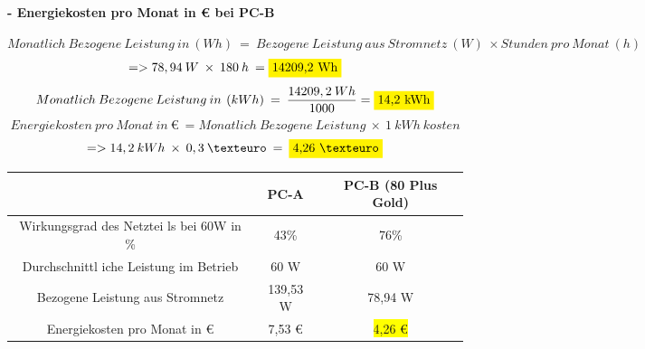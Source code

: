\documentclass[a4paper]{article}
\begin{document}
    \paragraph{\color{codegreen} - Energiekosten pro Monat in € bei PC-B}
    \begin{equation*}
        Monatlich\:Bezogene\:Leistung\:in\:\left(Wh\right)\:=\:Bezogene\:Leistung\:aus\:Stromnetz\:\left(W\right)\:\times Stunden\:pro\:Monat\:\left(h\right)
    \end{equation*}
    \begin{equation*}
        =>  78,94\:W\:\times \:180\:h\:=\colorbox{yellow}{14209,2 Wh}
    \end{equation*}
    \begin{equation*}
        Monatlich\:Bezogene\:Leistung\:in\:\left(kWh\right)\:=\:\frac{14209,2\:Wh}{1000}=\colorbox{yellow}{14,2 kWh}
    \end{equation*}
    \begin{equation*}
        Energiekosten\:pro\:Monat\:in\:€\:=Monatlich\:Bezogene\:Leistung\:\times \:1\:kWh\:kosten
    \end{equation*}
    \begin{equation*}
        => 14,2\:kWh\:\times \:0,3\:€\:=\:\colorbox{yellow}{4,26 €}
    \end{equation*}
    \begin{center}
        \begin{tabular}{|c|c|c|}
            \hline
            & {\color[HTML]{32CB00} PC-A} & {\color[HTML]{32CB00} PC-B \color[HTML]{FFD700}(80 Plus Gold)} \\ \hline
            {\color[HTML]{32CB00} Wirkungsgrad des Netztei ls bei 60W in \%} & {\color[HTML]{32CB00} 43\%}    & {\color[HTML]{32CB00} 76\%} \\ \hline
            {\color[HTML]{32CB00} Durchschnittl iche Leistung im Betrieb}    & {\color[HTML]{32CB00} 60 W}     & {\color[HTML]{32CB00} 60 W}  \\ \hline
            {\color[HTML]{32CB00} Bezogene Leistung aus Stromnetz}           & {\color[HTML]{32CB00} 139,53 W} & {\color[HTML]{FE0000} 78,94 W}    \\ \hline
            {\color[HTML]{32CB00} Energiekosten pro Monat in €}              & {\color[HTML]{CB0000} 7,53 €}       & {\color[HTML]{FE0000} \colorbox{yellow}{4,26 €}}    \\ \hline
        \end{tabular}
    \end{center}
\end{document}

